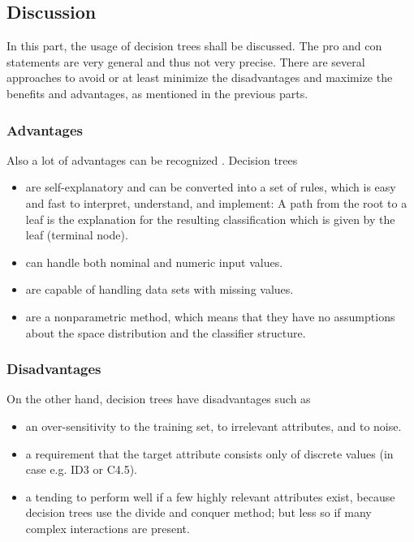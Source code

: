 \subsection{Discussion}

In this part, the usage of decision trees shall be discussed. The pro and con statements are very general and thus not very precise. There are several approaches to avoid or at least minimize the disadvantages and maximize the benefits and advantages, as mentioned in the previous parts.


\subsubsection{Advantages}

Also a lot of advantages can be recognized \cite[p. 73ff.]{rokach2008data}. Decision trees
\begin{itemize}
    \item are self-explanatory and can be converted into a set of rules, which is easy and fast to interpret, understand, and implement: A path from the root to a leaf is the explanation for the resulting classification which is given by the leaf (terminal node). 
    \item can handle both nominal and numeric input values.
    \item are capable of handling data sets with missing values.
    \item are a nonparametric method, which means that they have no assumptions about the space distribution and the classifier structure. 
\end{itemize}


\subsubsection{Disadvantages}
On the other hand, decision trees have disadvantages such as 
\begin{itemize}
    \item an over-sensitivity to the training set, to irrelevant attributes, and to noise.
    \item a requirement that the target attribute consists only of discrete values (in case e.g. ID3 or C4.5).
    \item a tending to perform well if a few highly relevant attributes exist, because decision trees use the divide and conquer method; but less so if many complex interactions are present. 
\end{itemize}






